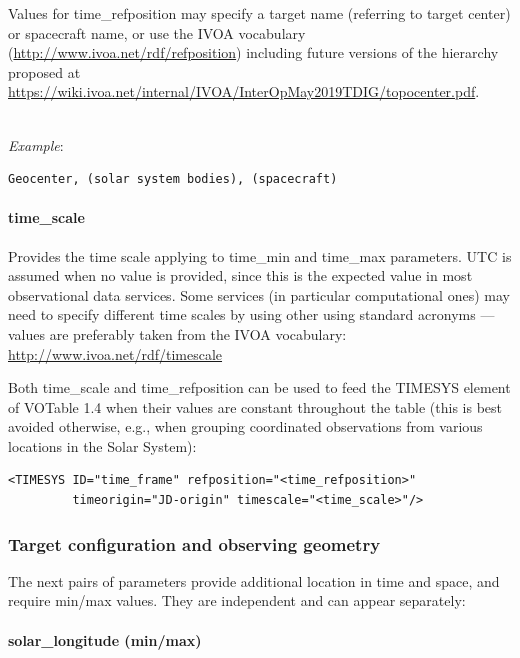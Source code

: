 \documentclass[11pt,a4paper]{ivoa}
\begin{document}
Values for time\_refposition may specify a target name (referring
to target center) or spacecraft name, or use the IVOA vocabulary
(\url{http://www.ivoa.net/rdf/refposition})
including future versions of the hierarchy proposed at
\url{https://wiki.ivoa.net/internal/IVOA/InterOpMay2019TDIG/topocenter.pdf}.

\textbf{\\}
\emph{Example}:

\begin{verbatim}
Geocenter, (solar system bodies), (spacecraft)
\end{verbatim}

\paragraph{time\_scale}

Provides the time scale applying to time\_min and time\_max parameters.
UTC is assumed when no value is provided, since this
is the expected value in most observational data services.
Some services (in particular computational ones) may need to specify
different time scales by using other using standard acronyms
— values are preferably taken from the IVOA vocabulary:
\url{http://www.ivoa.net/rdf/timescale}

Both time\_scale and time\_refposition can be used to feed the TIMESYS
element of VOTable 1.4 when their values are constant throughout the
table (this is best avoided otherwise, e.g., when grouping coordinated
observations from various locations in the Solar System):

\begin{verbatim}
<TIMESYS ID="time_frame" refposition="<time_refposition>"
         timeorigin="JD-origin" timescale="<time_scale>"/>
\end{verbatim}

\subsubsection{Target configuration and observing geometry}

The next pairs of parameters provide additional location in time and
space, and require min/max values. They are independent and can appear
separately:

\paragraph{solar\_longitude (min/max)}
\end{document}
